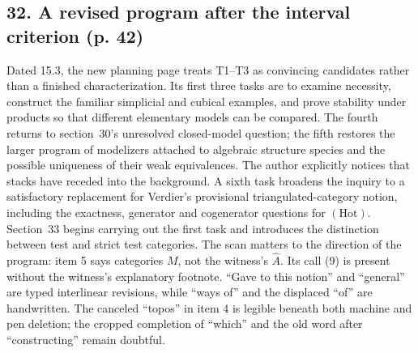 \documentclass[10pt,oneside]{book}
\begin{document}
\subsection*{32. A revised program after the interval criterion (p. 42)}
Dated 15.3, the new planning page treats T1--T3 as convincing candidates rather than a finished characterization. Its first three tasks are to examine necessity, construct the familiar simplicial and cubical examples, and prove stability under products so that different elementary models can be compared. The fourth returns to section~30's unresolved closed-model question; the fifth restores the larger program of modelizers attached to algebraic structure species and the possible uniqueness of their weak equivalences. The author explicitly notices that stacks have receded into the background. A sixth task broadens the inquiry to a satisfactory replacement for Verdier's provisional triangulated-category notion, including the exactness, generator and cogenerator questions for $(\mathrm{Hot})$. Section~33 begins carrying out the first task and introduces the distinction between test and strict test categories. The scan matters to the direction of the program: item 5 says categories $M$, not the witness's $\widehat A$. Its call (9) is present without the witness's explanatory footnote. ``Gave to this notion'' and ``general'' are typed interlinear revisions, while ``ways of'' and the displaced ``of'' are handwritten. The canceled ``topos'' in item 4 is legible beneath both machine and pen deletion; the cropped completion of ``which'' and the old word after ``constructing'' remain doubtful.
\end{document}
